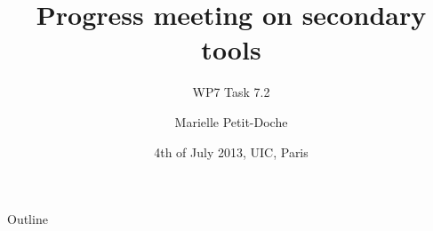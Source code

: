 \documentclass{beamer}
\title[Progress meeting T7.2] %
{Progress meeting on secondary tools}
\subtitle
{WP7 Task 7.2}
\author[WP7 - Task 7.2] %
{Marielle Petit-Doche}
\institute[Systerel] %
{\pgfdeclareimage[height=1cm]{systerel-logo}{logoSysterel}
 \pgfuseimage{systerel-logo}
 }
\date[4th of July, Paris] %
{4th of July 2013, UIC, Paris}
\begin{document}
\begin{frame}
  \titlepage
\end{frame}

\begin{frame}{Outline}
  \tableofcontents
\end{frame}









\end{document}
